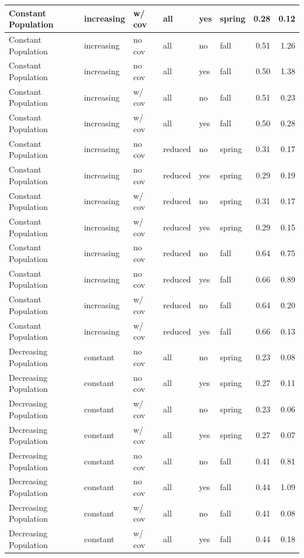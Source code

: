 \documentclass[
]{article}
\begin{document}
\begin{tabular}{l|l|l|l|l|l|r|r}
Constant Population & increasing & w/ cov & all & yes & spring & 0.28 & 0.12\\
\hline
Constant Population & increasing & no cov & all & no & fall & 0.51 & 1.26\\
\hline
Constant Population & increasing & no cov & all & yes & fall & 0.50 & 1.38\\
\hline
Constant Population & increasing & w/ cov & all & no & fall & 0.51 & 0.23\\
\hline
Constant Population & increasing & w/ cov & all & yes & fall & 0.50 & 0.28\\
\hline
Constant Population & increasing & no cov & reduced & no & spring & 0.31 & 0.17\\
\hline
Constant Population & increasing & no cov & reduced & yes & spring & 0.29 & 0.19\\
\hline
Constant Population & increasing & w/ cov & reduced & no & spring & 0.31 & 0.17\\
\hline
Constant Population & increasing & w/ cov & reduced & yes & spring & 0.29 & 0.15\\
\hline
Constant Population & increasing & no cov & reduced & no & fall & 0.64 & 0.75\\
\hline
Constant Population & increasing & no cov & reduced & yes & fall & 0.66 & 0.89\\
\hline
Constant Population & increasing & w/ cov & reduced & no & fall & 0.64 & 0.20\\
\hline
Constant Population & increasing & w/ cov & reduced & yes & fall & 0.66 & 0.13\\
\hline
Decreasing Population & constant & no cov & all & no & spring & 0.23 & 0.08\\
\hline
Decreasing Population & constant & no cov & all & yes & spring & 0.27 & 0.11\\
\hline
Decreasing Population & constant & w/ cov & all & no & spring & 0.23 & 0.06\\
\hline
Decreasing Population & constant & w/ cov & all & yes & spring & 0.27 & 0.07\\
\hline
Decreasing Population & constant & no cov & all & no & fall & 0.41 & 0.81\\
\hline
Decreasing Population & constant & no cov & all & yes & fall & 0.44 & 1.09\\
\hline
Decreasing Population & constant & w/ cov & all & no & fall & 0.41 & 0.08\\
\hline
Decreasing Population & constant & w/ cov & all & yes & fall & 0.44 & 0.18\\

\end{tabular}
\end{document}
